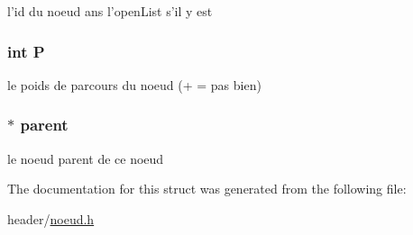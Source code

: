 l'id du noeud ans l'open\-List s'il y est 

\hypertarget{struct_noeud_aef94be98e2c9e4a4dece75f60ca9792c}{
\subsubsection[{P}]{\setlength{\rightskip}{0pt plus 5cm}int P}}\label{struct_noeud_aef94be98e2c9e4a4dece75f60ca9792c}


le poids de parcours du noeud (+ = pas bien) 

\hypertarget{struct_noeud_a55d34286ce81380f1f0e3fc2a782ae52}{
\subsubsection[{parent}]{$\ast$ parent}}\label{struct_noeud_a55d34286ce81380f1f0e3fc2a782ae52}


le noeud parent de ce noeud 



The documentation for this struct was generated from the following file\-:\begin{DoxyCompactItemize}
\item 
header/\hyperlink{noeud_8h}{noeud.\-h}\end{DoxyCompactItemize}
